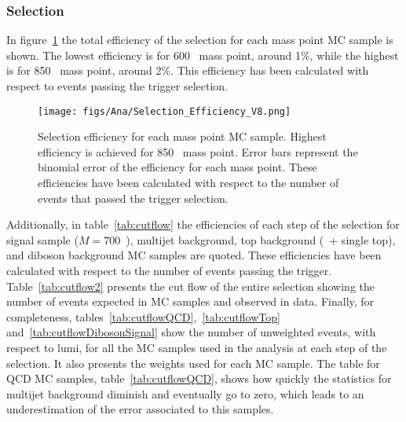 \subsubsection{Selection}
\label{sec:seleff}

In figure~\ref{fig:MPEff} the total efficiency of the selection for each mass point MC sample is shown. The lowest efficiency is for 600 \GeVcc~mass point, around 1\%, while the highest is for 850 \GeVcc~mass point, around 2\%. This efficiency has been calculated with respect to events passing the trigger selection.  

\begin{figure}[!Hhtbp]
  \begin{center}
    \texttt{[image: figs/Ana/Selection\_Efficiency\_V8.png]}
    \caption{Selection efficiency for each mass point MC sample. Highest efficiency is achieved for 850 \GeVcc~mass point. Error bars represent the binomial error of the efficiency for each mass point. These efficiencies have been calculated with respect to the number of events that passed the trigger selection.}
    \label{fig:MPEff}
  \end{center}
\end{figure}

Additionally, in table~\ref{tab:cutflow} the efficiencies of each step of the selection for signal sample (${M=700}$~\GeVcc), multijet background, top background (\ttbar~+ single top), and diboson background MC samples are quoted. These efficiencies have been calculated with respect to the number of events passing the trigger. Table~\ref{tab:cutflow2} presents the cut flow of the entire selection showing the number of events expected in MC samples and observed in data. Finally, for completeness, tables~\ref{tab:cutflowQCD},~\ref{tab:cutflowTop} and~\ref{tab:cutflowDibosonSignal} show the number of unweighted events, with respect to lumi, for all the MC samples used in the analysis at each step of the selection. It also presents the weights used for each MC sample. The table for QCD MC samples, table~\ref{tab:cutflowQCD}, shows how quickly the statistics for multijet background diminish and eventually go to zero, which leads to an underestimation of the error associated to this samples. 

